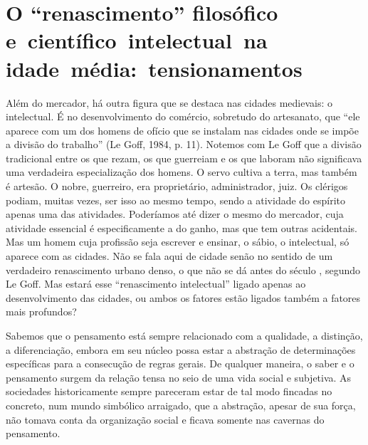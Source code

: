 \section*{O ``renascimento'' filosófico e~científico~intelectual~na idade~média:~tensionamentos}

Além do mercador, há outra figura que se destaca nas cidades medievais:
o intelectual. É no desenvolvimento do comércio, sobretudo do
artesanato, que ``ele aparece com um dos homens de ofício que se
instalam nas cidades onde se impõe a divisão do trabalho'' (Le Goff,
1984, p. 11). Notemos com Le Goff que a divisão tradicional entre os que
rezam, os que guerreiam e os que laboram não significava uma verdadeira
especialização dos homens. O servo cultiva a terra, mas também é
artesão. O nobre, guerreiro, era proprietário, administrador, juiz. Os
clérigos podiam, muitas vezes, ser isso ao mesmo tempo, sendo a
atividade do espírito apenas uma das atividades. Poderíamos até dizer
o mesmo do mercador, cuja atividade essencial
é especificamente a do ganho, mas que tem outras acidentais. Mas um
homem cuja profissão seja escrever e ensinar, o sábio, o intelectual, só
aparece com as cidades. Não se fala aqui de cidade senão no sentido de
um verdadeiro renascimento urbano denso, o que não se dá antes do século
, segundo Le Goff. Mas estará esse ``renascimento intelectual''
ligado apenas ao desenvolvimento das cidades, ou ambos os fatores estão
ligados também a fatores mais profundos?

Sabemos que o pensamento está sempre relacionado com a qualidade, a
distinção, a diferenciação, embora em seu núcleo possa estar a abstração
de determinações específicas para a consecução de regras gerais. De
qualquer maneira, o saber e o pensamento surgem da relação tensa no seio
de uma vida social e subjetiva. As sociedades historicamente sempre
pareceram estar de tal modo fincadas no concreto, num mundo simbólico
arraigado, que a abstração, apesar de sua força, não tomava conta da
organização social e ficava somente nas cavernas do pensamento.

